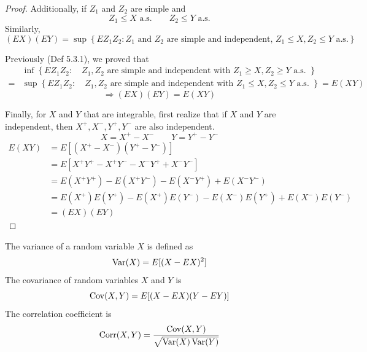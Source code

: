 \begin{reqproof}
\begin{theorem}
\begin{proof}
Additionally, if $Z_1$ and $Z_2$ are simple and
\[Z_1 \leq X \text{ a.s.} \qquad Z_2 \leq Y \text{ a.s.}\]
Similarly,
\[(EX)(EY) = \sup\left\{EZ_1Z_2: Z_1 \text{ and }Z_2 \text{ are simple and independent, }Z_1 \leq X, Z_2 \leq Y \text{ a.s.}\right\}\]

Previously (Def 5.3.1), we proved that
\begin{align*}
    &\inf\left\{EZ_1Z_2: \quad Z_1, Z_2 \text{ are simple and independent with }Z_1 \geq X, Z_2 \geq Y \text{ a.s. }\right\}\\
    = &\sup\left\{EZ_1Z_2: \quad Z_1, Z_2 \text{ are simple and independent with }Z_1 \leq X, Z_2 \leq Y \text{ a.s. }\right\} = E(XY)
\end{align*}
\[\Rightarrow (EX)(EY) = E(XY)\]

Finally, for $X$ and $Y$ that are integrable, first realize that if $X$ and $Y$ are independent, then $X^+, X^-, Y^+, Y^-$ are also independent.
\[X = X^+ - X^- \qquad Y = Y^+ - Y^-\]
\begin{align*}
    E(XY) &= E[(X^+ - X^-)(Y^+ - Y^-)]\\
    &=E[X^+Y^+ - X^+ Y^- - X^- Y^+ + X^- Y^-]\\
    &= E(X^+Y^+) - E(X^+Y^-) - E(X^- Y^+) + E(X^- Y^-)\\
    &= E(X^+)E(Y^+) - E(X^+)E(Y^-) - E(X^-)E(Y^+) + E(X^-)E(Y^-)\\
    &=(EX)(EY)
\end{align*}
    \end{proof}
\end{theorem}
\end{reqproof}

\begin{definition}
    The variance of a random variable $X$ is defined as
    \[\operatorname{Var}(X) = E[(X-EX)^2]\]
    The covariance of random variables $X$ and $Y$ is
    \[\operatorname{Cov}(X,Y) = E[(X-EX)(Y-EY)]\]
    The correlation coefficient is
    \[\text{Corr}(X,Y) = \frac{\operatorname{Cov}(X,Y)}{\sqrt{\operatorname{Var}(X)\operatorname{Var}(Y)}}\]
\end{definition}
